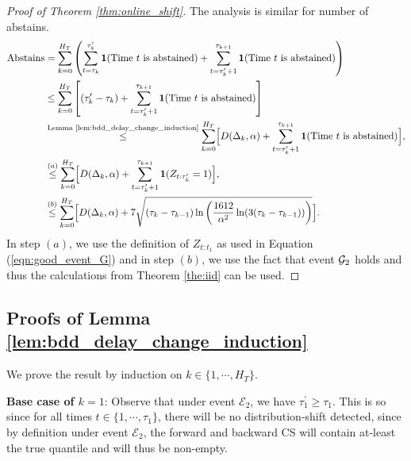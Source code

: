 \begin{proof}[Proof of Theorem \ref{thm:online_shift}]
The analysis is similar for number of abstains. 
\begin{align*}
    \text{Abstains}  &= \sum_{k=0}^{H_T} \left( \sum_{t=\tau_k}^{\tau'_k} \mathbf{1}(\text{Time $t$ is abstained)} + \sum_{t=\tau'_k + 1}^{\tau_{k+1}} \mathbf{1}(\text{Time $t$ is abstained)} \right) \\
    &\leq \sum_{k=0}^{H_T} \left[(\tau_{k}' - \tau_k) + \sum_{t=\tau'_k + 1}^{\tau_{k+1}} \mathbf{1}(\text{Time $t$ is abstained)}\right] \\
    &\stackrel{\text{Lemma \ref{lem:bdd_delay_change_induction}}}{\leq} \sum_{k=0}^{H_T} 
    \Bigl[ D(\Delta_k, \alpha) + \sum_{t=\tau'_k + 1}^{\tau_{k+1}} \mathbf{1}(\text{Time $t$ is abstained)} \Bigr], \\
     &\stackrel{(a)}{\leq} \sum_{k=0}^{H_T} 
    \Bigl[ D(\Delta_k, \alpha) + \sum_{t=\tau_k' + 1}^{\tau_{k+1}} \mathbf{1}(Z_{t:\tau'_k}=1) \Bigr], \\
         &\stackrel{(b)}{\leq} \sum_{k=0}^{H_T} 
    \Bigl[ D(\Delta_k, \alpha) +  7 \sqrt{(\tau_k-\tau_{k-1}) \ln \left( \frac{1612}{\alpha^2} \ln(3(\tau_k-\tau_{k-1})) \right)}  \Bigr].
\end{align*}
In step $(a)$, we use the definition of $Z_{t:t_1}$ as used in Equation (\ref{eqn:good_event_G}) and in step $(b)$, we use the fact that event ${\mathcal{G}}_2$ holds and thus the calculations from Theorem \ref{the:iid} can be used. 
\end{proof}

\subsection{Proofs of Lemma  \ref{lem:bdd_delay_change_induction}}

We prove the result by induction on $k \in \{1,\cdots, H_T\}$. 

\textbf{Base case of $k=1$}: 
Observe that under event $\mathcal{E}_2$, we have $\tau_1^{'} \geq \tau_1$. This is so since for all times $t \in \{1,\cdots, \tau_1\}$, there will be no distribution-shift detected, since by definition under event $\mathcal{E}_2$, the forward and backward CS will contain at-least the true quantile and will thus be non-empty. 

